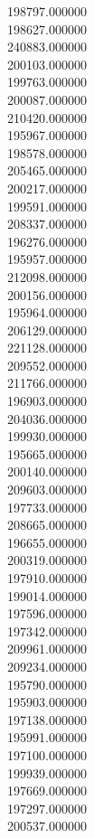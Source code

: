 198797.000000\\
198627.000000\\
240883.000000\\
200103.000000\\
199763.000000\\
200087.000000\\
210420.000000\\
195967.000000\\
198578.000000\\
205465.000000\\
200217.000000\\
199591.000000\\
208337.000000\\
196276.000000\\
195957.000000\\
212098.000000\\
200156.000000\\
195964.000000\\
206129.000000\\
221128.000000\\
209552.000000\\
211766.000000\\
196903.000000\\
204036.000000\\
199930.000000\\
195665.000000\\
200140.000000\\
209603.000000\\
197733.000000\\
208665.000000\\
196655.000000\\
200319.000000\\
197910.000000\\
199014.000000\\
197596.000000\\
197342.000000\\
209961.000000\\
209234.000000\\
195790.000000\\
195903.000000\\
197138.000000\\
195991.000000\\
197100.000000\\
199939.000000\\
197669.000000\\
197297.000000\\
200537.000000\\
